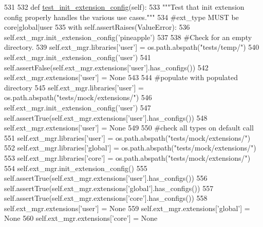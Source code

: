 \begin{DoxyCode}
531 
532 \textcolor{keyword}{def }\hyperlink{namespacetests_1_1utils_1_1extension__manager__tests_a369ad0d8b9b3bbcba076f242c0eeec0e}{test\_init\_extension\_config}(self):
533     \textcolor{stringliteral}{"""Test that init extension config properly handles the various use cases."""}
534     \textcolor{comment}{#ext\_type MUST be core|global|user}
535     with self.assertRaises(ValueError):
536         self.ext\_mgr.init\_extension\_config(\textcolor{stringliteral}{'pineapple'})
537         
538         \textcolor{comment}{#Check for an empty directory.}
539         self.ext\_mgr.libraries[\textcolor{stringliteral}{'user'}] = os.path.abspath(\textcolor{stringliteral}{"tests/temp/"})
540         self.ext\_mgr.init\_extension\_config(\textcolor{stringliteral}{'user'})
541         self.assertFalse(self.ext\_mgr.extensions[\textcolor{stringliteral}{'user'}].has\_configs())
542         self.ext\_mgr.extensions[\textcolor{stringliteral}{'user'}] = \textcolor{keywordtype}{None}
543 
544         \textcolor{comment}{#populate with populated directory}
545         self.ext\_mgr.libraries[\textcolor{stringliteral}{'user'}] = os.path.abspath(\textcolor{stringliteral}{"tests/mock/extensions/"})
546         self.ext\_mgr.init\_extension\_config(\textcolor{stringliteral}{'user'})
547         self.assertTrue(self.ext\_mgr.extensions[\textcolor{stringliteral}{'user'}].has\_configs())
548         self.ext\_mgr.extensions[\textcolor{stringliteral}{'user'}] = \textcolor{keywordtype}{None}
549         
550         \textcolor{comment}{#check all types on default call}
551         self.ext\_mgr.libraries[\textcolor{stringliteral}{'user'}] = os.path.abspath(\textcolor{stringliteral}{"tests/mock/extensions/"})
552         self.ext\_mgr.libraries[\textcolor{stringliteral}{'global'}] = os.path.abspath(\textcolor{stringliteral}{"tests/mock/extensions/"})
553         self.ext\_mgr.libraries[\textcolor{stringliteral}{'core'}] = os.path.abspath(\textcolor{stringliteral}{"tests/mock/extensions/"})
554         self.ext\_mgr.init\_extension\_config()
555         self.assertTrue(self.ext\_mgr.extensions[\textcolor{stringliteral}{'user'}].has\_configs())
556         self.assertTrue(self.ext\_mgr.extensions[\textcolor{stringliteral}{'global'}].has\_configs())
557         self.assertTrue(self.ext\_mgr.extensions[\textcolor{stringliteral}{'core'}].has\_configs())
558         self.ext\_mgr.extensions[\textcolor{stringliteral}{'user'}] = \textcolor{keywordtype}{None}
559         self.ext\_mgr.extensions[\textcolor{stringliteral}{'global'}] = \textcolor{keywordtype}{None}
560         self.ext\_mgr.extensions[\textcolor{stringliteral}{'core'}] = \textcolor{keywordtype}{None}        
\end{DoxyCode}
